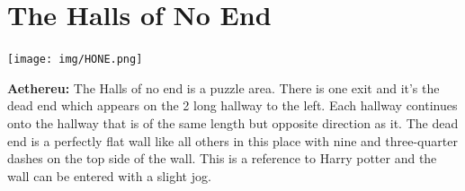 \section{The Halls of No End}
\begin{center}
	\texttt{[image: img/HONE.png]} 
	
	{\textbf{Aethereu:} The Halls of no end is a puzzle area. There is one exit and it's the dead end which appears on the 2 long hallway to the left. Each hallway continues onto the hallway that is of the same length but opposite direction as it. The dead end is a perfectly flat wall like all others in this place with nine and three-quarter dashes on the top side of the wall. This is a reference to Harry potter and the wall can be entered with a slight jog.}
\end{center}